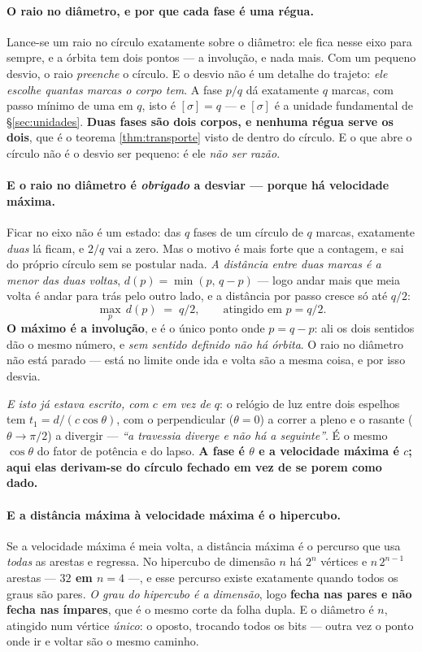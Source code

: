 \documentclass[livro.tex]{subfiles}
\begin{document}
\paragraph{O raio no diâmetro, e por que cada fase é uma régua.} Lance-se um raio no círculo
exatamente sobre o diâmetro: ele fica nesse eixo para sempre, e a órbita tem dois pontos --- a
involução, e nada mais. Com um pequeno desvio, o raio \emph{preenche} o círculo. E o desvio não é
um detalhe do trajeto: \emph{ele escolhe quantas marcas o corpo tem}. A fase $p/q$ dá exatamente
$q$ marcas, com passo mínimo de uma em $q$, isto é $[\sigma]=q$ --- e $[\sigma]$ é a unidade
fundamental de \S\ref{sec:unidades}. \textbf{Duas fases são dois corpos, e nenhuma régua serve os
dois}, que é o teorema \ref{thm:transporte} visto de dentro do círculo. E o que abre o círculo não é o
desvio ser pequeno: é ele \emph{não ser razão}.

\paragraph{E o raio no diâmetro é \emph{obrigado} a desviar --- porque há velocidade máxima.}
Ficar no eixo não é um estado: das $q$ fases de um círculo de $q$ marcas, exatamente \emph{duas}
lá ficam, e $2/q$ vai a zero. Mas o motivo é mais forte que a contagem, e sai do próprio círculo
sem se postular nada. \emph{A distância entre duas marcas é a menor das duas voltas}, $d(p)=\min(p,\,q-p)$
--- logo andar mais que meia volta é andar para trás pelo outro lado, e a distância por passo
cresce só até $q/2$:
\[
  \max_p\, d(p) \;=\; q/2, \qquad\text{atingido em } p=q/2 .
\]
\textbf{O máximo é a involução}, e é o único ponto onde $p=q-p$: ali os dois sentidos dão o mesmo
número, e \emph{sem sentido definido não há órbita}. O raio no diâmetro não está parado --- está no
limite onde ida e volta são a mesma coisa, e por isso desvia.

\medskip
\noindent \emph{E isto já estava escrito, com $c$ em vez de $q$}: o relógio de luz entre dois
espelhos tem $t_1=d/(c\cos\theta)$, com o perpendicular ($\theta=0$) a correr a pleno e o rasante
($\theta\to\pi/2$) a divergir --- \emph{``a travessia diverge e não há a seguinte''}. É o mesmo
$\cos\theta$ do fator de potência e do lapso. \textbf{A fase é $\theta$ e a velocidade máxima é $c$;
aqui elas derivam-se do círculo fechado em vez de se porem como dado.}

\paragraph{E a distância máxima à velocidade máxima é o hipercubo.} Se a velocidade máxima é
meia volta, a distância máxima é o percurso que usa \emph{todas} as arestas e regressa. No
hipercubo de dimensão $n$ há $2^n$ vértices e $n\,2^{n-1}$ arestas --- \textbf{$32$ em $n=4$} ---, e
esse percurso existe exatamente quando todos os graus são pares. \emph{O grau do hipercubo é a
dimensão}, logo \textbf{fecha nas pares e não fecha nas ímpares}, que é o mesmo corte da folha
dupla. E o diâmetro é $n$, atingido num vértice \emph{único}: o oposto, trocando todos os bits ---
outra vez o ponto onde ir e voltar são o mesmo caminho.
\end{document}
